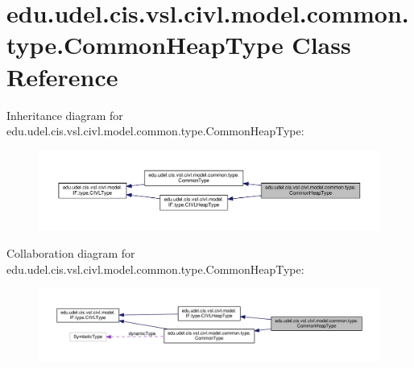 \hypertarget{classedu_1_1udel_1_1cis_1_1vsl_1_1civl_1_1model_1_1common_1_1type_1_1CommonHeapType}{}\section{edu.\+udel.\+cis.\+vsl.\+civl.\+model.\+common.\+type.\+Common\+Heap\+Type Class Reference}
\label{classedu_1_1udel_1_1cis_1_1vsl_1_1civl_1_1model_1_1common_1_1type_1_1CommonHeapType}


Inheritance diagram for edu.\+udel.\+cis.\+vsl.\+civl.\+model.\+common.\+type.\+Common\+Heap\+Type\+:
\nopagebreak
\begin{figure}[H]
\begin{center}
\leavevmode
\includegraphics[width=350pt]{classedu_1_1udel_1_1cis_1_1vsl_1_1civl_1_1model_1_1common_1_1type_1_1CommonHeapType__inherit__graph}
\end{center}
\end{figure}


Collaboration diagram for edu.\+udel.\+cis.\+vsl.\+civl.\+model.\+common.\+type.\+Common\+Heap\+Type\+:
\nopagebreak
\begin{figure}[H]
\begin{center}
\leavevmode
\includegraphics[width=350pt]{classedu_1_1udel_1_1cis_1_1vsl_1_1civl_1_1model_1_1common_1_1type_1_1CommonHeapType__coll__graph}
\end{center}
\end{figure}
